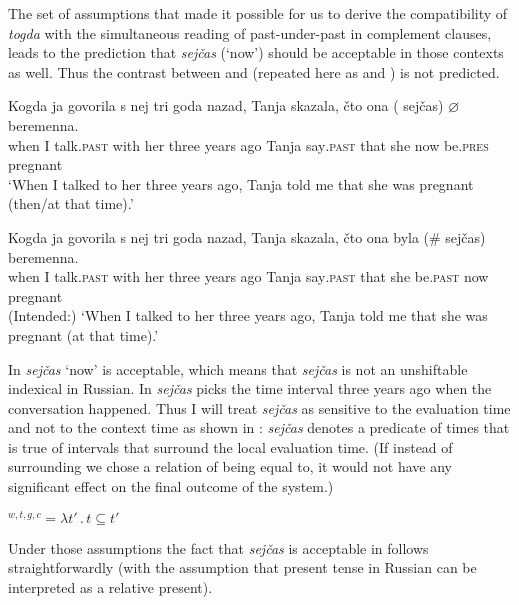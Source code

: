 \documentclass[output=paper,
modfonts,
newtxmath,
hidelinks
]{langscibook}
\begin{document}
The set of assumptions that made it possible for us to derive the compatibility of \textit{togda} with the simultaneous reading of past-under-past in complement clauses, leads to the prediction that \textit{sejčas} (‘now’) should be acceptable in those contexts as well. Thus the contrast between  and  (repeated here as  and ) is not predicted.

\ea \label{ex43}
\gll Kogda ja govorila s nej tri goda nazad, Tanja skazala, čto ona\hspace{5pt} (\hspace{-2pt} sejčas) ${\varnothing}$ beremenna.\\
     when I talk\textsc{.past} with her three years ago Tanja say\textsc{.past} that she {} now be.\textsc{pres} pregnant\\
\glt `When I talked to her three years ago, Tanja told me that she was pregnant (then/at that time).'
\z

\ea \label{ex44}
\gll Kogda ja govorila s nej tri goda nazad, Tanja skazala, čto ona byla (\#\hspace{-2pt} sejčas) beremenna.\\
     when I talk\textsc{.past} with her three years ago Tanja say\textsc{.past} that she be.\textsc{past} {} now pregnant\\
\glt (Intended:) `When I talked to her three years ago, Tanja told me that she was pregnant (at that time).'
\z

\noindent In  \textit{sejčas} ‘now’ is acceptable, which means that \textit{sejčas} is not an unshiftable indexical in Russian. In  \textit{sejčas} picks the time interval three years ago when the conversation happened. Thus I will treat \textit{sejčas} as sensitive to the evaluation time and not to the context time as shown in : \textit{sejčas} denotes a predicate of times that is true of intervals that surround the local evaluation time. (If instead of surrounding we chose a relation of being equal to, it would not have any significant effect on the final outcome of the system.)

\ea {}$^{w,t,g,c}=\lambda t'\,.\,t\subseteq t'$\label{ex45}
\z

\noindent Under those assumptions the fact that \textit{sejčas} is acceptable in  follows straightforwardly (with the assumption that present tense in Russian can be interpreted as a relative present).\largerpage[2]
\end{document}
